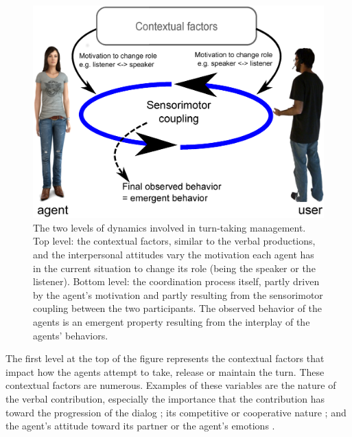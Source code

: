 \documentclass[twocolumn]{svjour3}
\begin{document}
\begin{figure}
  \centering
  \includegraphics[width=\linewidth]{figure/schema_motivation.eps}

  \caption{The two levels of dynamics involved in turn-taking management. 
    Top level: the contextual factors, similar to the verbal productions, and the interpersonal attitudes vary the motivation each agent has in the current situation to change its role (being the speaker or the listener). 
Bottom level: the coordination process itself, partly driven by the agent's motivation and partly resulting from the sensorimotor coupling between the two participants. 
The observed behavior of the agents is an emergent property resulting from the interplay of the agents' behaviors.}
  \label{fig:mot}
\end{figure}

The first level at the top of the figure represents the contextual factors that impact how the agents attempt to take, release or maintain the turn. These contextual factors are numerous. Examples of these variables are the nature of the verbal contribution, especially the importance that the contribution has toward the progression of the dialog \citep{selfridge_bidding_2009}; its competitive or cooperative nature \citep{cafaro_effects_2016}; and the agent's attitude toward its partner \citep{ter_maat_how_2010} or the agent's emotions \citep{ter_maat_turn_2009}.
\end{document}
